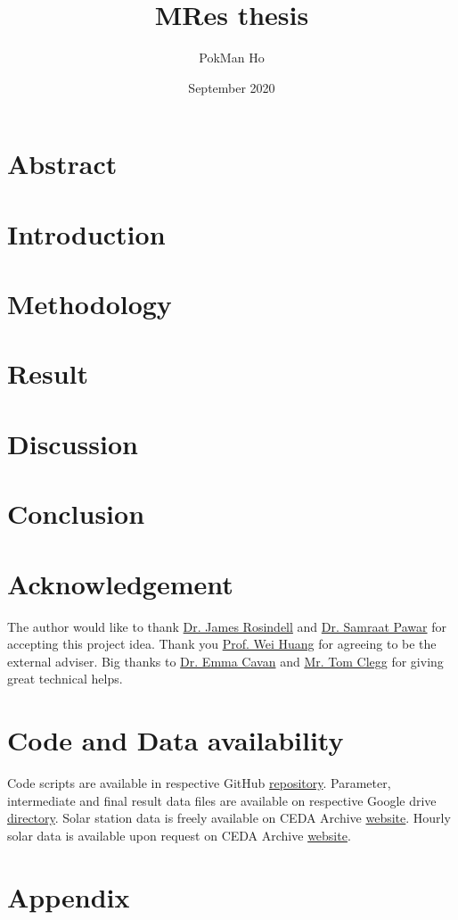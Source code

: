 \documentclass[a4paper,11pt]{article}
\title{MRes thesis}
\author{PokMan Ho}
\date{September 2020}
\begin{document}
\maketitle

\section{Abstract}


\section{Introduction}


\section{Methodology}


\section{Result}


\section{Discussion}


\section{Conclusion}


\section{Acknowledgement}
The author would like to thank \href{mailto:j.rosindell@imperial.ac.uk}{Dr. James Rosindell} and \href{mailto:s.pawar@imperial.ac.uk}{Dr. Samraat Pawar} for accepting this project idea.  Thank you \href{mailto:wei.huang@eng.ox.ac.uk}{Prof. Wei Huang} for agreeing to be the external adviser.  Big thanks to \href{mailto:e.cavan@imperial.ac.uk}{Dr. Emma Cavan} and \href{mailto:t.clegg17@imperial.ac.uk}{Mr. Tom Clegg} for giving great technical helps.

\section{Code and Data availability}
Code scripts are available in respective GitHub \href{https://github.com/ph-u/Project}{repository}.  Parameter, intermediate and final result data files are available on respective Google drive \href{https://drive.google.com/drive/folders/1tp2miPXis7bn-km1THC3ZaRHSRXQGCi5?usp=sharing}{directory}.  Solar station data is freely available on CEDA Archive \href{http://archive.ceda.ac.uk/midas_stations/google_earth/}{website}.  Hourly solar data is available upon request on CEDA Archive \href{https://catalogue.ceda.ac.uk/uuid/220a65615218d5c9cc9e4785a3234bd0}{website}.

\nocite{*}\printbibliography

\section{Appendix}

\end{document}
